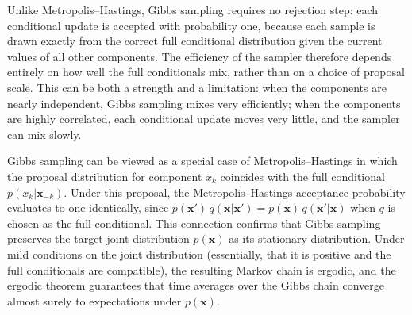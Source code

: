 Unlike Metropolis--Hastings, Gibbs sampling requires no rejection step: each conditional update is accepted with probability one, because each sample is drawn exactly from the correct full conditional distribution given the current values of all other components. The efficiency of the sampler therefore depends entirely on how well the full conditionals mix, rather than on a choice of proposal scale. This can be both a strength and a limitation: when the components are nearly independent, Gibbs sampling mixes very efficiently; when the components are highly correlated, each conditional update moves very little, and the sampler can mix slowly.

Gibbs sampling can be viewed as a special case of Metropolis--Hastings in which the proposal distribution for component $x_k$ coincides with the full conditional $p(x_k|\mathbf{x}_{-k})$. Under this proposal, the Metropolis--Hastings acceptance probability evaluates to one identically, since $p(\mathbf{x}')\,q(\mathbf{x}|\mathbf{x}') = p(\mathbf{x})\,q(\mathbf{x}'|\mathbf{x})$ when $q$ is chosen as the full conditional. This connection confirms that Gibbs sampling preserves the target joint distribution $p(\mathbf{x})$ as its stationary distribution. Under mild conditions on the joint distribution (essentially, that it is positive and the full conditionals are compatible), the resulting Markov chain is ergodic, and the ergodic theorem guarantees that time averages over the Gibbs chain converge almost surely to expectations under $p(\mathbf{x})$.

%


%